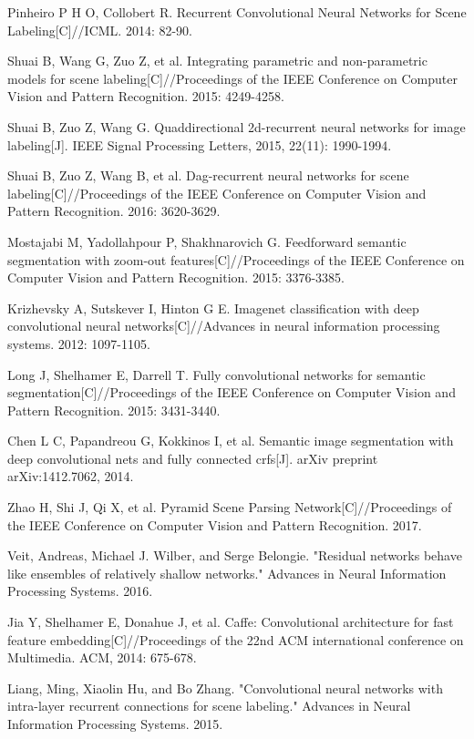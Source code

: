 \documentclass[10.5pt,compsoc]{TsT}
\theoremstyle{mystyle}
\begin{document}
{\begin{thebibliography}{99}
Pinheiro P H O, Collobert R. Recurrent Convolutional Neural Networks for Scene Labeling[C]//ICML. 2014: 82-90.

Shuai B, Wang G, Zuo Z, et al. Integrating parametric and non-parametric models for scene labeling[C]//Proceedings of the IEEE Conference on Computer Vision and Pattern Recognition. 2015: 4249-4258.

Shuai B, Zuo Z, Wang G. Quaddirectional 2d-recurrent neural networks for image labeling[J]. IEEE Signal Processing Letters, 2015, 22(11): 1990-1994.

Shuai B, Zuo Z, Wang B, et al. Dag-recurrent neural networks for scene labeling[C]//Proceedings of the IEEE Conference on Computer Vision and Pattern Recognition. 2016: 3620-3629.

Mostajabi M, Yadollahpour P, Shakhnarovich G. Feedforward semantic segmentation with zoom-out features[C]//Proceedings of the IEEE Conference on Computer Vision and Pattern Recognition. 2015: 3376-3385.

Krizhevsky A, Sutskever I, Hinton G E. Imagenet classification with deep convolutional neural networks[C]//Advances in neural information processing systems. 2012: 1097-1105.

Long J, Shelhamer E, Darrell T. Fully convolutional networks for semantic segmentation[C]//Proceedings of the IEEE Conference on Computer Vision and Pattern Recognition. 2015: 3431-3440.

Chen L C, Papandreou G, Kokkinos I, et al. Semantic image segmentation with deep convolutional nets and fully connected crfs[J]. arXiv preprint arXiv:1412.7062, 2014.

Zhao H, Shi J, Qi X, et al. Pyramid Scene Parsing Network[C]//Proceedings of the IEEE Conference on Computer Vision and Pattern Recognition. 2017.

Veit, Andreas, Michael J. Wilber, and Serge Belongie. "Residual networks behave like ensembles of relatively shallow networks." Advances in Neural Information Processing Systems. 2016.

Jia Y, Shelhamer E, Donahue J, et al. Caffe: Convolutional architecture for fast feature embedding[C]//Proceedings of the 22nd ACM international conference on Multimedia. ACM, 2014: 675-678.

Liang, Ming, Xiaolin Hu, and Bo Zhang. "Convolutional neural networks with intra-layer recurrent connections for scene labeling." Advances in Neural Information Processing Systems. 2015.


\end{thebibliography}}
\end{document}
